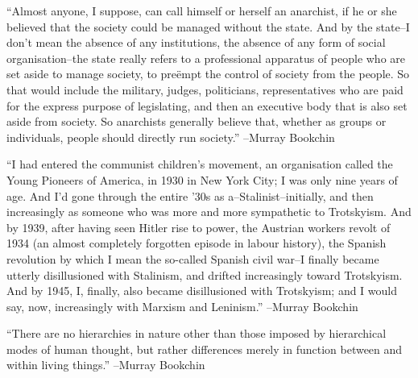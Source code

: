 \documentclass{article}%
\begin{document}
\linebreak%
\vspace{1mm}%
\begin{minipage}{\textwidth}%
\flushleft%
“Almost anyone, I suppose, can call himself or herself an anarchist, if he or she believed that the society could be managed without the state. And by the state–I don't mean the absence of any institutions, the absence of any form of social organisation–the state really refers to a professional apparatus of people who are set aside to manage society, to preëmpt the control of society from the people. So that would include the military, judges, politicians, representatives who are paid for the express purpose of legislating, and then an executive body that is also set aside from society. So anarchists generally believe that, whether as groups or individuals, people should directly run society.”%
\linebreak%
\vspace{1mm}%
–Murray Bookchin%
\linebreak%
\vspace{1mm}%
\end{minipage}%
\linebreak%
\vspace{1mm}%
\begin{minipage}{\textwidth}%
\flushleft%
“I had entered the communist children's movement, an organisation called the Young Pioneers of America, in 1930 in New York City; I was only nine years of age. And I'd gone through the entire '30s as a–Stalinist–initially, and then increasingly as someone who was more and more sympathetic to Trotskyism. And by 1939, after having seen Hitler rise to power, the Austrian workers revolt of 1934 (an almost completely forgotten episode in labour history), the Spanish revolution by which I mean the so{-}called Spanish civil war–I finally became utterly disillusioned with Stalinism, and drifted increasingly toward Trotskyism. And by 1945, I, finally, also became disillusioned with Trotskyism; and I would say, now, increasingly with Marxism and Leninism.”%
\linebreak%
\vspace{1mm}%
–Murray Bookchin%
\linebreak%
\vspace{1mm}%
\end{minipage}%
\linebreak%
\vspace{1mm}%
\begin{minipage}{\textwidth}%
\flushleft%
“There are no hierarchies in nature other than those imposed by hierarchical modes of human thought, but rather differences merely in function between and within living things.”%
\linebreak%
\vspace{1mm}%
–Murray Bookchin%
\linebreak%
\vspace{1mm}%
\end{minipage}%
\end{document}
